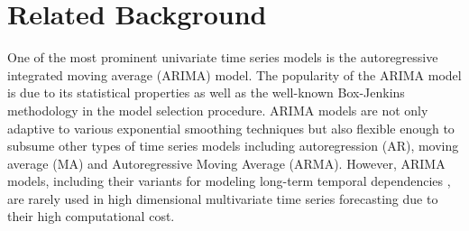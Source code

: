 \section{Related Background}
\label{sec:related}


One of the most prominent univariate time series models is the autoregressive integrated moving average (ARIMA) model. The popularity of the ARIMA model is due to its statistical properties as well as the well-known Box-Jenkins methodology \cite{box2015time} in the model selection procedure. ARIMA models are not only adaptive to various exponential smoothing techniques \cite{mckenzie1984general} but also flexible enough to subsume other types of time series models including autoregression (AR), moving average (MA) and Autoregressive Moving Average (ARMA). However, ARIMA models, including their variants for modeling long-term temporal dependencies \cite{box2015time}, are rarely used in high dimensional multivariate time series forecasting due to their high computational cost. %

